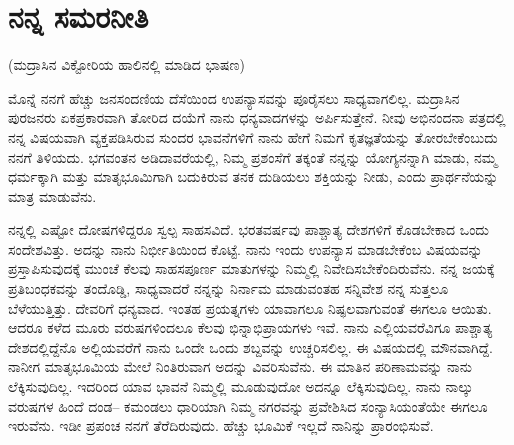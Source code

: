 
\chapter{ನನ್ನ ಸಮರನೀತಿ}

\begin{center}
(ಮದ್ರಾಸಿನ ವಿಕ್ಟೋರಿಯ ಹಾಲಿನಲ್ಲಿ ಮಾಡಿದ ಭಾಷಣ)
\end{center}

ಮೊನ್ನೆ ನನಗೆ ಹೆಚ್ಚು ಜನಸಂದಣಿಯ ದೆಸೆಯಿಂದ ಉಪನ್ಯಾಸವನ್ನು ಪೂರೈಸಲು ಸಾಧ್ಯವಾಗಲಿಲ್ಲ. ಮದ್ರಾಸಿನ ಪುರಜನರು ಏಕಪ್ರಕಾರವಾಗಿ ತೋರಿದ ದಯೆಗೆ ನಾನು ಧನ್ಯವಾದಗಳನ್ನು ಅರ್ಪಿಸುತ್ತೇನೆ. ನೀವು ಅಭಿನಂದನಾ ಪತ್ರದಲ್ಲಿ ನನ್ನ ವಿಷಯವಾಗಿ ವ್ಯಕ್ತಪಡಿಸಿರುವ ಸುಂದರ ಭಾವನೆಗಳಿಗೆ ನಾನು ಹೇಗೆ ನಿಮಗೆ ಕೃತಜ್ಞತೆಯನ್ನು ತೋರಬೇಕೆಂಬುದು ನನಗೆ ತಿಳಿಯದು. ಭಗವಂತನ ಅಡಿದಾವರೆಯಲ್ಲಿ, ನಿಮ್ಮ ಪ್ರಶಂಸೆಗೆ ತಕ್ಕಂತೆ ನನ್ನನ್ನು ಯೋಗ್ಯನನ್ನಾಗಿ ಮಾಡು, ನಮ್ಮ ಧರ್ಮಕ್ಕಾಗಿ ಮತ್ತು ಮಾತೃಭೂಮಿಗಾಗಿ ಬದುಕಿರುವ ತನಕ ದುಡಿಯಲು ಶಕ್ತಿಯನ್ನು ನೀಡು, ಎಂದು ಪ್ರಾರ್ಥನೆಯನ್ನು ಮಾತ್ರ ಮಾಡುವೆನು.

ನನ್ನಲ್ಲಿ ಎಷ್ಟೋ ದೋಷಗಳಿದ್ದರೂ ಸ್ವಲ್ಪ ಸಾಹಸವಿದೆ. ಭರತವರ್ಷವು ಪಾಶ್ಚಾತ್ಯ ದೇಶಗಳಿಗೆ ಕೊಡಬೇಕಾದ ಒಂದು ಸಂದೇಶವಿತ್ತು. ಅದನ್ನು ನಾನು ನಿರ್ಭೀತಿಯಿಂದ ಕೊಟ್ಟೆ. ನಾನು ಇಂದು ಉಪನ್ಯಾಸ ಮಾಡಬೇಕೆಂಬ ವಿಷಯವನ್ನು ಪ್ರಸ್ತಾಪಿಸುವುದಕ್ಕೆ ಮುಂಚೆ ಕೆಲವು ಸಾಹಸಪೂರ್ಣ ಮಾತುಗಳನ್ನು ನಿಮ್ಮಲ್ಲಿ ನಿವೇದಿಸಬೇಕೆಂದಿರುವೆನು. ನನ್ನ ಜಯಕ್ಕೆ ಪ್ರತಿಬಂಧಕವನ್ನು ತಂದೊಡ್ಡಿ, ಸಾಧ್ಯವಾದರೆ ನನ್ನನ್ನು ನಿರ್ನಾಮ ಮಾಡುವಂತಹ ಸನ್ನಿವೇಶ ನನ್ನ ಸುತ್ತಲೂ ಬೆಳೆಯುತ್ತಿತ್ತು. ದೇವರಿಗೆ ಧನ್ಯವಾದ. ಇಂತಹ ಪ್ರಯತ್ನಗಳು ಯಾವಾಗಲೂ ನಿಷ್ಫಲವಾಗುವಂತೆ ಈಗಲೂ ಆಯಿತು. ಆದರೂ ಕಳೆದ ಮೂರು ವರುಷಗಳಿಂದಲೂ ಕೆಲವು ಭಿನ್ನಾಭಿಪ್ರಾಯಗಳು ಇವೆ. ನಾನು ಎಲ್ಲಿಯವರೆವಿಗೂ ಪಾಶ್ಚಾತ್ಯ ದೇಶದಲ್ಲಿದ್ದೆನೊ ಅಲ್ಲಿಯವರೆಗೆ ನಾನು ಒಂದೇ ಒಂದು ಶಬ್ದವನ್ನು ಉಚ್ಚರಿಸಲಿಲ್ಲ. ಈ ವಿಷಯದಲ್ಲಿ ಮೌನವಾಗಿದ್ದೆ. ನಾನೀಗ ಮಾತೃಭೂಮಿಯ ಮೇಲೆ ನಿಂತಿರುವಾಗ ಅದನ್ನು ವಿವರಿಸುವೆನು. ಈ ಮಾತಿನ ಪರಿಣಾಮವನ್ನು ನಾನು ಲೆಕ್ಕಿಸುವುದಿಲ್ಲ. ಇದರಿಂದ ಯಾವ ಭಾವನೆ ನಿಮ್ಮಲ್ಲಿ ಮೂಡುವುದೋ ಅದನ್ನೂ ಲೆಕ್ಕಿಸುವುದಿಲ್ಲ. ನಾನು ನಾಲ್ಕು ವರುಷಗಳ ಹಿಂದೆ ದಂಡ– ಕಮಂಡಲು ಧಾರಿಯಾಗಿ ನಿಮ್ಮ ನಗರವನ್ನು ಪ್ರವೇಶಿಸಿದ ಸಂನ್ಯಾಸಿಯಂತೆಯೇ ಈಗಲೂ ಇರುವೆನು. ಇಡೀ ಪ್ರಪಂಚ ನನಗೆ ತೆರೆದಿರುವುದು. ಹೆಚ್ಚು ಭೂಮಿಕೆ ಇಲ್ಲದೆ ನಾನಿನ್ನು ಪ್ರಾರಂಭಿಸುವೆ.

